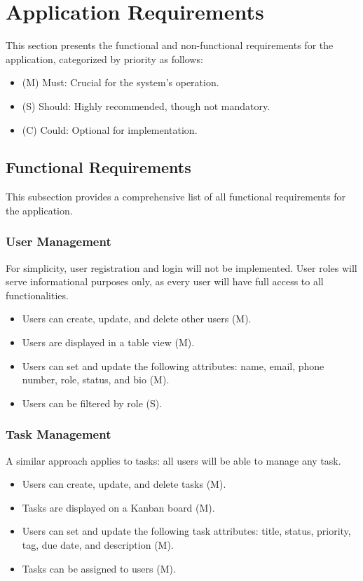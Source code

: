 \section{Application Requirements}
This section presents the functional and non-functional requirements for the application, categorized by priority as follows:
\begin{itemize}
   \item (M) Must: Crucial for the system's operation.
   \item (S) Should: Highly recommended, though not mandatory.
   \item (C) Could: Optional for implementation.
\end{itemize}

\subsection{Functional Requirements}
This subsection provides a comprehensive list of all functional requirements for the application.

\subsubsection*{User Management}
For simplicity, user registration and login will not be implemented. User roles will serve informational purposes only, as every user will have full access to all functionalities.
\begin{itemize}
   \item Users can create, update, and delete other users (M).
   \item Users are displayed in a table view (M).
   \item Users can set and update the following attributes: name, email, phone number, role, status, and bio (M).
   \item Users can be filtered by role (S).
\end{itemize}

\subsubsection*{Task Management}
A similar approach applies to tasks: all users will be able to manage any task.
\begin{itemize}
   \item Users can create, update, and delete tasks (M).
   \item Tasks are displayed on a Kanban board (M).
   \item Users can set and update the following task attributes: title, status, priority, tag, due date, and description (M).
   \item Tasks can be assigned to users (M).
\end{itemize}

